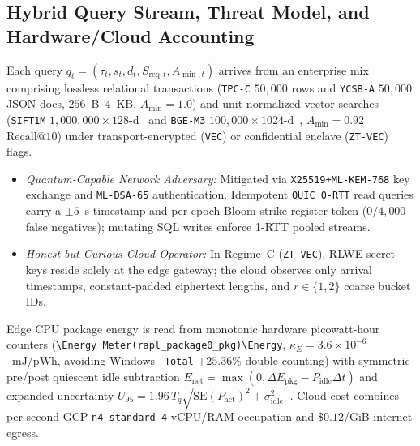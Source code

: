 \documentclass[10pt,journal,compsoc]{IEEEtran}
\begin{document}
\subsection{Hybrid Query Stream, Threat Model, and Hardware/Cloud Accounting}
Each query $q_t = (\tau_t, s_t, d_t, S_{\mathrm{req},t}, A_{\min,t})$ arrives from an enterprise mix comprising lossless relational transactions (\texttt{TPC-C} $50{,}000$ rows and \texttt{YCSB-A} $50{,}000$ JSON docs, $256$~B--$4$~KB, $A_{\min}=1.0$) and unit-normalized vector searches (\texttt{SIFT1M} $1{,}000{,}000 \times 128$-d~\cite{jegou2011sift} and \texttt{BGE-M3} $100{,}000 \times 1024$-d~\cite{chen2024bgem3}, $A_{\min}=0.92$ $\text{Recall@10}$) under transport-encrypted (\texttt{VEC}) or confidential enclave (\texttt{ZT-VEC}) flags.
\begin{itemize}
    \item \emph{Quantum-Capable Network Adversary:} Mitigated via \texttt{X25519+ML-KEM-768} key exchange and \texttt{ML-DSA-65} authentication. Idempotent \texttt{QUIC 0-RTT} read queries carry a $\pm 5$~s timestamp and per-epoch Bloom strike-register token ($0/4{,}000$ false negatives); mutating SQL writes enforce 1-RTT pooled streams.
    \item \emph{Honest-but-Curious Cloud Operator:} In Regime~C (\texttt{ZT-VEC}), RLWE secret keys reside solely at the edge gateway; the cloud observes only arrival timestamps, constant-padded ciphertext lengths, and $r \in \{1,2\}$ coarse bucket IDs.
\end{itemize}
Edge CPU package energy is read from monotonic hardware picowatt-hour counters (\texttt{\textbackslash Energy\allowbreak\ Meter(rapl\_\allowbreak package0\_\allowbreak pkg)\allowbreak\textbackslash Energy}, $\kappa_E = 3.6\times 10^{-6}$~mJ/pWh, avoiding Windows \texttt{\_Total} $+25.36\%$ double counting) with symmetric pre/post quiescent idle subtraction $E_{\mathrm{net}} = \max(0, \Delta E_{\mathrm{pkg}} - P_{\mathrm{idle}}\Delta t)$ and expanded uncertainty $U_{95} = 1.96\,T_q\sqrt{\mathrm{SE}(P_{\mathrm{act}})^2 + \sigma_{\mathrm{idle}}^2}$~\cite{khan2018rapl}. Cloud cost combines per-second GCP \texttt{n4-standard-4} vCPU/RAM occupation and $\$0.12$/GiB internet egress.
\end{document}
